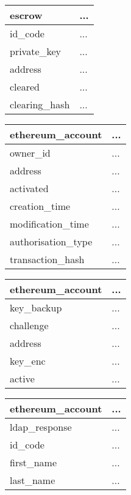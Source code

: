 \documentclass[12pt]{article} %
\begin{document}
{\begin{center}
\begin{tabular}{ | l | p{10cm} | }
 \hline
 \textbf{escrow} & ...
 \\ \hline\hline
 id\_code & ...
 \\ \hline
 private\_key & ...
 \\ \hline
 address & ...
 \\ \hline
 cleared & ...
 \\ \hline
 clearing\_hash & ...
 \\ \hline
\end{tabular}
\end{center}
\label{tab:idDatabaseEscrow}

\begin{center}
\begin{tabular}{ | l | p{10cm} | }
 \hline
 \textbf{ethereum\_account} & ...
 \\ \hline\hline
 owner\_id & ...
 \\ \hline
 address & ...
 \\ \hline
 activated & ...
 \\ \hline
 creation\_time & ...
 \\ \hline
 modification\_time & ...
 \\ \hline
 authorisation\_type & ...
 \\ \hline
 transaction\_hash & ...
 \\ \hline
\end{tabular}
\end{center}
\label{tab:idDatabaseEthereumAddress}

\begin{center}
\begin{tabular}{ | l | p{10cm} | }
 \hline
 \textbf{ethereum\_account} & ...
 \\ \hline\hline
 key\_backup & ...
 \\ \hline
 challenge & ...
 \\ \hline
 address & ...
 \\ \hline
 key\_enc & ...
 \\ \hline
 active & ...
 \\ \hline
\end{tabular}
\end{center}
\label{tab:idDatabaseKeyBackup}

\begin{center}
\begin{tabular}{ | l | p{10cm} | }
 \hline
 \textbf{ethereum\_account} & ...
 \\ \hline\hline
 ldap\_response & ...
 \\ \hline
 id\_code & ...
 \\ \hline
 first\_name & ...
 \\ \hline
 last\_name & ...
 \\ \hline
\end{tabular}
\end{center}
\label{tab:idDatabaseLdapResponse}

}
\end{document}
